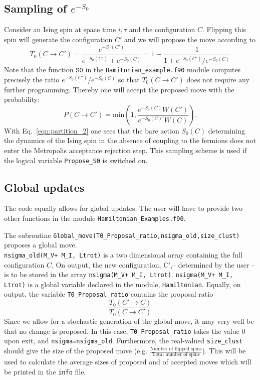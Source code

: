  \subsection{Sampling of $e^{-S_0}$}
  Consider an Ising spin at space time $i,\tau$ and the configuration $C$. Flipping this spin will generate the configuration $C'$ and we will propose the move according to 
  \begin{equation}
 T_0(C \rightarrow C')  =  \frac{e^{-S_0(C')}}{ e^{-S_0(C')} + e^{-S_0(C)} }   = 1 - \frac{1}{1 +  e^{-S_0(C')} /e^{-S_0(C)}}
  \end{equation}
 Note that the function $\texttt{S0}$ in the  \texttt{Hamitonian\_example.f90}  module  computes precisely the ratio $e^{-S_0(C')} /e^{-S_0(C)} $ so that  $T_0(C \rightarrow C') $ does not require any further programming. 
 Thereby one will accept  the proposed move with the probability: 
 \begin{equation}
 P(C \rightarrow C') =  \text{min}  \left( 1,  \frac{e^{-S_0(C)}   W(C')}{ e^{-S_0(C)'} W(C)} \right).
 \end{equation}
 With Eq.~\ref{eqn:partition_2}  one sees that the bare action $S_0(C)$  determining the  dynamics of the Ising spin  in the absence of coupling to the fermions  does not enter the Metropolis acceptance rejection step.  This sampling scheme is used  if the logical variable \texttt{Propose\_S0}   is switched on. 
 \subsection{Global updates}
The code equally allows for global updates.  The user will have to provide two other functions in the module \texttt{Hamiltonian\_Examples.f90}.   

The subroutine  \texttt{Global\_move(T0\_Proposal\_ratio,nsigma\_old,size\_clust)}  proposes  a global move. \\
\texttt{nsigma\_old(M\_V+ M\_I, Ltrot)} is a two dimensional  array containing  the full  configuration $C$.  On output, the new configuration, C',-- determined by the user -- is to be stored in the 
array  \texttt{nsigma(M\_V+ M\_I, Ltrot)}.    \texttt{nsigma(M\_V+ M\_I, Ltrot)} is a global variable declared in the module, \texttt{Hamiltonian}.  Equally, on output, the variable 
\texttt{T0\_Proposal\_ratio} contains the proposal ratio 
\begin{equation}
	 \frac{T_0(C' \rightarrow C)}{T_0(C \rightarrow C') }  
\end{equation}
Since we allow for a stochastic  generation of  the global move, it may very well be that no change is proposed. In this case, \texttt{T0\_Proposal\_ratio}   takes the value 0 upon exit, and  
\texttt{nsigma=nsigma\_old}.  
Furthermore, the real-valued \texttt{size\_clust} should give the size of the proposed move (e.g. $\tfrac{\text{Number of flipped spins}}{\text{Total number of spins}}$). This will be used to calculate the average sizes of proposed and of accepted moves which will be printed in the \texttt{info} file.

